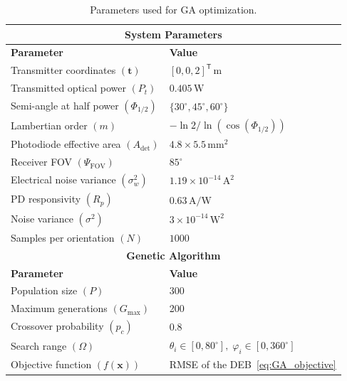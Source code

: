 \documentclass[journal]{IEEEtran}
\begin{document}
\begin{table}[tbh]
\centering
\caption{Parameters used for GA optimization.}
\label{tab:ga_params}
\begin{tabular}{|l|l|}
\hline
\multicolumn{2}{|c|}{\textbf{System Parameters}} \\ \hline
\textbf{Parameter}                  & \textbf{Value}                         \\ \hline
Transmitter coordinates $(\mathbf{t})$ & \([0,0,2]^{\mathsf T}\,\mathrm{m}\)              \\ \hline
Transmitted optical power $(P_t)$   & \(0.405\,\mathrm{W}\)            \\ \hline
Semi-angle at half power  $(\Phi_{1/2})$ & \(\{30^\circ,45^\circ,60^\circ\}\)                \\ \hline
Lambertian order $(m)$              & \(-\ln2/\ln(\cos(\Phi_{1/2}))\)    \\ \hline
Photodiode effective area $(A_{\mathrm{det}})$        & \(4.8\times5.5\,\mathrm{mm}^2\) \\ \hline
Receiver FOV $(\Psi_{\mathrm{FOV}})$        & \(85^\circ\)       \\ \hline
Electrical noise variance $(\sigma_w^2)$ & \(1.19\times10^{-14}\,\mathrm{A}^2\) \\ \hline
PD responsivity $(R_{p})$ & \(0.63\,\mathrm{A/W}\)          \\ \hline
Noise variance $(\sigma^2)$         & \(3\times10^{-14}\,\mathrm{W}^2\) \\ \hline
Samples per orientation $(N)$       & \(1000\)                           \\ \hline
\multicolumn{2}{|c|}{\textbf{Genetic Algorithm}} \\ \hline
\textbf{Parameter}                  & \textbf{Value}                         \\ \hline
Population size $(P)$                    & 300                                    \\ \hline
Maximum generations $(G_{\mathrm{max}})$     & 200                                    \\ \hline
Crossover probability $(p_c)$       & 0.8                                    \\ \hline
Search range $(\Omega)$             & \(\theta_{i}\in[0,80^\circ],\;\varphi_{i}\in[0,360^\circ]\) \\ \hline
Objective function $(f(\mathbf x))$   & RMSE of the DEB~\eqref{eq:GA_objective}                        \\ \hline

\end{tabular}
\end{table}
\end{document}
